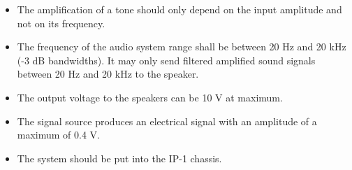 \begin{itemize}
    \item The amplification of a tone should only depend on the input amplitude and not on its frequency.
    \item The frequency of the audio system range shall be between 20 Hz and 20 kHz (-3 dB bandwidths). It may only send filtered amplified sound signals between 20 Hz and 20 kHz to the speaker.
    \item The output voltage to the speakers can be 10 V at maximum.
    \item The signal source produces an electrical signal with an amplitude of a maximum of 0.4 V.
    \item The system should be put into the IP-1 chassis. 
\end{itemize}


